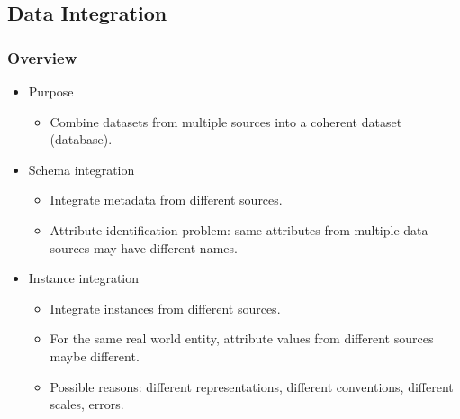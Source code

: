\documentclass[../notes.tex]{subfiles}
\begin{document}
\subsection{Data Integration}
\subsubsection{Overview}
\begin{itemize}
  \item Purpose
  \begin{itemize}
    \item Combine datasets from multiple sources into a coherent dataset (database).
  \end{itemize} 

  \item Schema integration
  \begin{itemize}
    \item Integrate metadata from different sources.
    \item Attribute identification problem: same attributes from multiple data sources may have different names.
  \end{itemize}

  \item Instance integration
  \begin{itemize}
    \item Integrate instances from different sources.
    \item For the same real world entity, attribute values from different sources maybe different.
    \item Possible reasons: different representations, different conventions, different scales, errors.
  \end{itemize}
\end{itemize}
\end{document}
